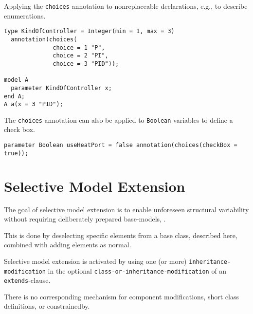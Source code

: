 \begin{example}
Applying the \lstinline!choices! annotation to nonreplaceable declarations, e.g., to describe enumerations.
\begin{lstlisting}[language=modelica]
type KindOfController = Integer(min = 1, max = 3)
  annotation(choices(
              choice = 1 "P",
              choice = 2 "PI",
              choice = 3 "PID"));

model A
  parameter KindOfController x;
end A;
A a(x = 3 "PID");
\end{lstlisting}

The \lstinline!choices! annotation can also be applied to \lstinline!Boolean! variables to define a check box.
\begin{lstlisting}[language=modelica]
parameter Boolean useHeatPort = false annotation(choices(checkBox = true));
\end{lstlisting}
\end{example}

\section{Selective Model Extension}\label{selective-model-extension}
\begin{nonnormative}
The goal of selective model extension is to enable unforeseen structural variability without requiring deliberately prepared base-models, \textcite{Buerger2019SelectiveModel}.

This is done by deselecting specific elements from a base class, described here, combined with adding elements as normal.
\end{nonnormative}
Selective model extension is activated by using one (or more) \lstinline[language=grammar]!inheritance-modification! in the optional \lstinline[language=grammar]!class-or-inheritance-modification! of an \lstinline!extends!-clause.
\begin{nonnormative}
There is no corresponding mechanism for component modifications, short class definitions, or constrainedby.
\end{nonnormative}

